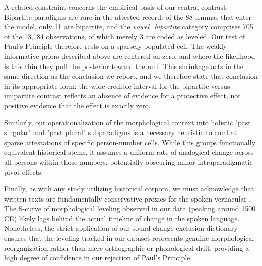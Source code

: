 A related constraint concerns the empirical basis of our central contrast. Bipartite paradigms are rare in the attested record: of the 88 lemmas that enter the model, only 11 are bipartite, and the \textit{vowel\_bipartite} category comprises 705 of the 13,184 observations, of which merely 3 are coded as leveled. Our test of Paul's Principle therefore rests on a sparsely populated cell. The weakly informative priors described above are centered on zero, and where the likelihood is this thin they pull the posterior toward the null. This shrinkage acts in the same direction as the conclusion we report, and we therefore state that conclusion in its appropriate form: the wide credible interval for the bipartite versus unipartite contrast reflects an absence of evidence for a protective effect, not positive evidence that the effect is exactly zero.

Similarly, our operationalization of the morphological context into holistic "past singular" and "past plural" subparadigms is a necessary heuristic to combat sparse attestations of specific person-number cells. While this groups functionally equivalent historical stems, it assumes a uniform rate of analogical change across all persons within those numbers, potentially obscuring minor intraparadigmatic pivot effects.

Finally, as with any study utilizing historical corpora, we must acknowledge that written texts are fundamentally conservative proxies for the spoken vernacular \citep{desmet_vandevelde2019}. The S-curve of morphological leveling observed in our data (peaking around 1500 CE) likely lags behind the actual timeline of change in the spoken language. Nonetheless, the strict application of our sound-change exclusion dictionary ensures that the leveling tracked in our dataset represents genuine morphological reorganization rather than mere orthographic or phonological drift, providing a high degree of confidence in our rejection of Paul's Principle.
